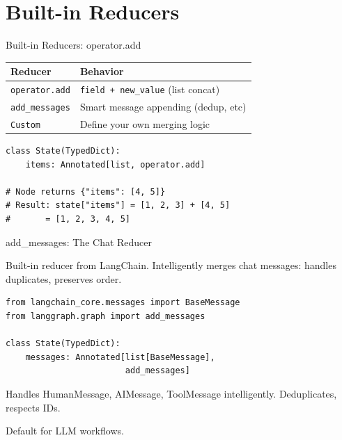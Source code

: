 \documentclass[aspectratio=169,11pt]{beamer}
\begin{document}
\section{Built-in Reducers}
\begin{frame}[fragile,t,shrink=2]{Built-in Reducers: operator.add}
\vspace{0.05cm}

\begin{tabular}{p{3.5cm}p{6.5cm}}
\toprule
\textbf{Reducer} & \textbf{Behavior} \\
\midrule
\texttt{operator.add} & \texttt{field + new\_value} (list concat) \\
\texttt{add\_messages} & Smart message appending (dedup, etc) \\
\texttt{Custom} & Define your own merging logic \\
\bottomrule
\end{tabular}

\vspace{0.15cm}

\begin{codebox}
\begin{lstlisting}
class State(TypedDict):
    items: Annotated[list, operator.add]

# Node returns {"items": [4, 5]}
# Result: state["items"] = [1, 2, 3] + [4, 5]
#       = [1, 2, 3, 4, 5]
\end{lstlisting}
\end{codebox}
\end{frame}

\begin{frame}[fragile,t,shrink=5]{add\_messages: The Chat Reducer}
\vspace{0.1cm}

\begin{conceptbox}
Built-in reducer from LangChain. Intelligently merges chat messages: handles duplicates, preserves order.
\end{conceptbox}

\vspace{0.1cm}

\begin{codebox}
\begin{lstlisting}
from langchain_core.messages import BaseMessage
from langgraph.graph import add_messages

class State(TypedDict):
    messages: Annotated[list[BaseMessage],
                        add_messages]
\end{lstlisting}
\end{codebox}

\vspace{0.1cm}

\begin{tipbox}
Handles HumanMessage, AIMessage, ToolMessage intelligently. Deduplicates, respects IDs.
\end{tipbox}

{\footnotesize Default for LLM workflows.}
\end{frame}
\end{document}
